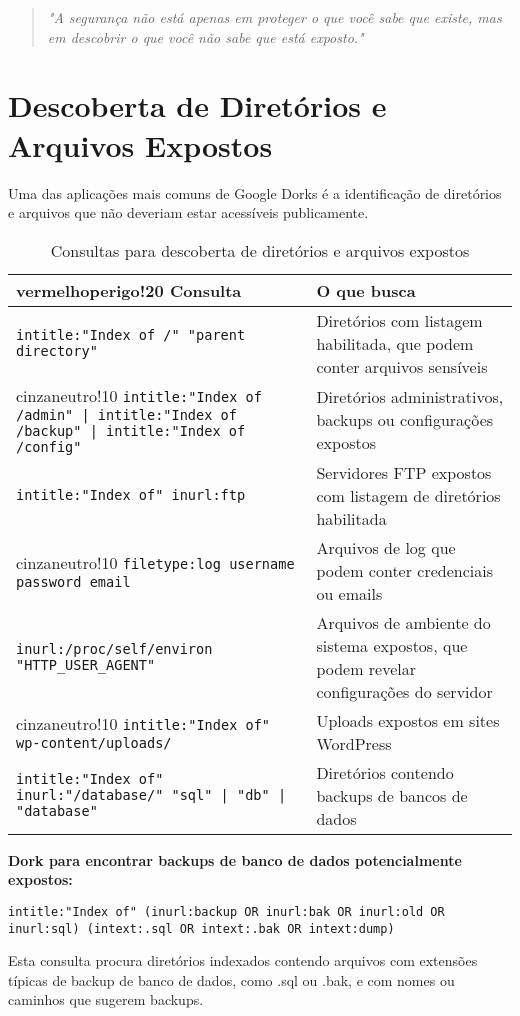 \documentclass[12pt,a4paper]{book}
\begin{document}
\begin{quote}
\textit{"A segurança não está apenas em proteger o que você sabe que existe, mas em descobrir o que você não sabe que está exposto."} \\
\end{quote}

\section{Descoberta de Diretórios e Arquivos Expostos}

Uma das aplicações mais comuns de Google Dorks é a identificação de diretórios e arquivos que não deveriam estar acessíveis publicamente.

\begin{table}[h]
\centering
\begin{tabular}{|p{8cm}|p{7cm}|}
\hline
{vermelhoperigo!20} \textbf{Consulta} & \textbf{O que busca} \\
\hline
\texttt{intitle:"Index of /" "parent directory"} & Diretórios com listagem habilitada, que podem conter arquivos sensíveis \\
\hline
{cinzaneutro!10} \texttt{intitle:"Index of /admin" | intitle:"Index of /backup" | intitle:"Index of /config"} & Diretórios administrativos, backups ou configurações expostos \\
\hline
\texttt{intitle:"Index of" inurl:ftp} & Servidores FTP expostos com listagem de diretórios habilitada \\
\hline
{cinzaneutro!10} \texttt{filetype:log username password email} & Arquivos de log que podem conter credenciais ou emails \\
\hline
\texttt{inurl:/proc/self/environ "HTTP\_USER\_AGENT"} & Arquivos de ambiente do sistema expostos, que podem revelar configurações do servidor \\
\hline
{cinzaneutro!10} \texttt{intitle:"Index of" wp-content/uploads/} & Uploads expostos em sites WordPress \\
\hline
\texttt{intitle:"Index of" inurl:"/database/" "sql" | "db" | "database"} & Diretórios contendo backups de bancos de dados \\
\hline
\end{tabular}
\caption{Consultas para descoberta de diretórios e arquivos expostos}
\end{table}

\begin{examplebox}
\textbf{Dork para encontrar backups de banco de dados potencialmente expostos:}

\texttt{intitle:"Index of" (inurl:backup OR inurl:bak OR inurl:old OR inurl:sql) (intext:.sql OR intext:.bak OR intext:dump)}

Esta consulta procura diretórios indexados contendo arquivos com extensões típicas de backup de banco de dados, como .sql ou .bak, e com nomes ou caminhos que sugerem backups.
\end{examplebox}
\end{document}
